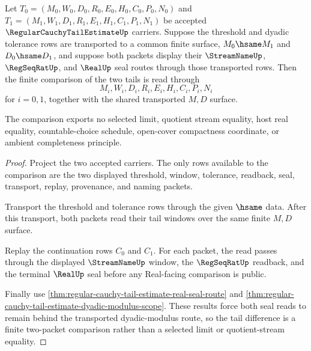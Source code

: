 \begin{theorem}
\label{thm:regular-cauchy-tail-difference}
Let $T_0=(M_0,W_0,D_0,R_0,E_0,H_0,C_0,P_0,N_0)$ and
$T_1=(M_1,W_1,D_1,R_1,E_1,H_1,C_1,P_1,N_1)$ be accepted
$\RegularCauchyTailEstimateUp$ carriers. Suppose the threshold and dyadic
tolerance rows are transported to a common finite surface,
$M_0 \hsame M_1$ and $D_0 \hsame D_1$, and suppose both packets display their
$\StreamNameUp$, $\RegSeqRatUp$, and $\RealUp$ seal routes through those
transported rows. Then the finite comparison of the two tails is read through
$$
M_i,W_i,D_i,R_i,E_i,H_i,C_i,P_i,N_i
$$
for $i=0,1$, together with the shared transported $M,D$ surface.

The comparison exports no selected limit, quotient stream equality, host real
equality, countable-choice schedule, open-cover compactness coordinate, or
ambient completeness principle.
\end{theorem}
\begin{proof}
Project the two accepted carriers. The only rows available to the comparison
are the two displayed threshold, window, tolerance, readback, seal, transport,
replay, provenance, and naming packets.

Transport the threshold and tolerance rows through the given $\hsame$ data.
After this transport, both packets read their tail windows over the same
finite $M,D$ surface.

Replay the continuation rows $C_0$ and $C_1$. For each packet, the read passes
through the displayed $\StreamNameUp$ window, the $\RegSeqRatUp$ readback, and
the terminal $\RealUp$ seal before any Real-facing comparison is public.

Finally use \autoref{thm:regular-cauchy-tail-estimate-real-seal-route} and
\autoref{thm:regular-cauchy-tail-estimate-dyadic-modulus-scope}. These results
force both seal reads to remain behind the transported dyadic-modulus route,
so the tail difference is a finite two-packet comparison rather than a
selected limit or quotient-stream equality.
\end{proof}

